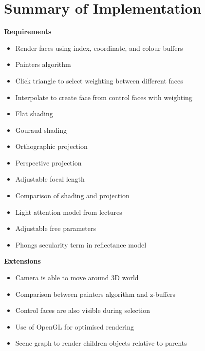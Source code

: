 \documentclass[12pt]{article}
\begin{document}
\newpage
\section{Summary of Implementation}
\noindent\textbf{Requirements}
\begin{itemize}
    \itemsep0em
    \item  Render faces using index, coordinate, and colour buffers
    \item  Painters algorithm 
    \item  Click triangle to select weighting between different faces
    \item  Interpolate to create face from control faces with weighting
    \item  Flat shading
    \item  Gouraud shading
    \item  Orthographic projection
    \item  Perspective projection
    \item  Adjustable focal length
    \item  Comparison of shading and projection
    \item  Light attention model from lectures
    \item  Adjustable free parameters
    \item  Phongs secularity term in reflectance model
\end{itemize}

\noindent\textbf{Extensions}
\begin{itemize}
\itemsep0em
\item Camera is able to move around 3D world
\item Comparison between painters algorithm and z-buffers 
\item Control faces are also visible during selection
\item Use of OpenGL for optimised rendering
\item Scene graph to render children objects relative to parents
\end{itemize}

\printbibliography
\end{document}
